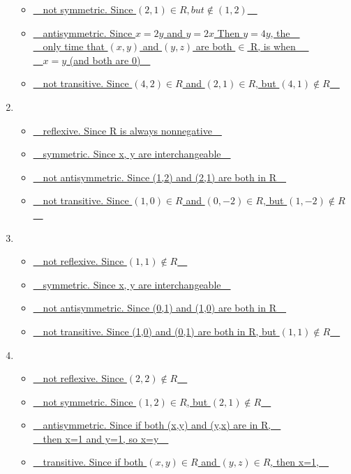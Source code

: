 \documentclass[sigconf]{acmart}
\begin{document}
\begin{enumerate}[label=(\alph*)]
\begin{itemize}
        \item \underline{~~not symmetric. Since $(2,1) \in R, but \notin (1,2)$~~}
        \item \underline{~~antisymmetric. Since $x=2y$ and $y=2x$ Then $y=4y$, the~~}\\
        \underline{~~only time that $(x,y)$ and $(y,z)$ are both $\in$ R, is when ~~}\\
        \underline{~~$x=y$ (and both are 0)~~}
        \item \underline{~~not transitive. Since $(4,2) \in R$ and $(2,1) \in R$, but $(4,1) \notin R$~~}
    \end{itemize}
    \item 
    \begin{itemize}
        \item \underline{~~reflexive. Since R is always nonnegative~~}
        \item \underline{~~symmetric. Since x, y are interchangeable~~}
        \item \underline{~~not antisymmetric. Since (1,2) and (2,1) are both in R~~}
        \item \underline{~~not transitive. Since $(1,0) \in R$ and $(0, -2) \in R$, but $(1,-2) \notin R$~~}
    \end{itemize}
    \item
    \begin{itemize}
        \item \underline{~~not reflexive. Since $(1,1) \notin R$~~}
        \item \underline{~~symmetric. Since x, y are interchangeable~~}
        \item \underline{~~not antisymmetric. Since (0,1) and (1,0) are both in R~~}
        \item \underline{~~not transitive. Since (1,0) and (0,1) are both in R, but $(1,1) \notin R$~~}
    \end{itemize}
    \item
    \begin{itemize}
        \item \underline{~~not reflexive. Since $(2,2) \notin R$~~}
        \item \underline{~~not symmetric. Since $(1,2) \in R$, but $(2,1) \notin R$~~}
        \item \underline{~~antisymmetric. Since if both (x,y) and (y,x) are in R,~~}\\
        \underline{~~then x=1 and y=1, so x=y~~}
        \item \underline{~~transitive. Since if both $(x,y) \in R$ and $(y,z) \in R$, then x=1,~~}\\

\end{itemize}
\end{enumerate}
\end{document}
